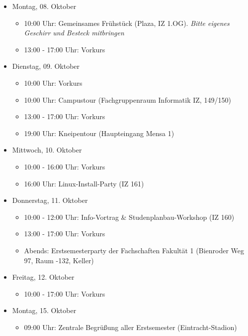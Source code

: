 \begin{itemize}
    \item Montag, 08. Oktober
        \begin{itemize}
            \item 10:00 Uhr: Gemeinsames Frühstück (Plaza, IZ 1.OG). \emph{Bitte eigenes Geschirr und Besteck mitbringen}
            \item 13:00 - 17:00 Uhr: Vorkurs
        \end{itemize}
    \item Dienstag, 09. Oktober
        \begin{itemize}
            \item 10:00 Uhr: Vorkurs
            \item 10:00 Uhr: Campustour (Fachgruppenraum Informatik IZ, 149/150)
            \item 13:00 - 17:00 Uhr: Vorkurs
            \item 19:00 Uhr: Kneipentour (Haupteingang Mensa 1)
        \end{itemize}
    \item Mittwoch, 10. Oktober
        \begin{itemize}
            \item 10:00 - 16:00 Uhr: Vorkurs
            \item 16:00 Uhr: Linux-Install-Party (IZ 161)
        \end{itemize}
    \pagebreak
    \item Donnerstag, 11. Oktober
        \begin{itemize}
            \item 10:00 - 12:00 Uhr: Info-Vortrag \& Studenplanbau-Workshop (IZ 160)
            \item 13:00 - 17:00 Uhr: Vorkurs
            \item Abends: Erstsemesterparty der Fachschaften Fakultät 1 (Bienroder Weg 97, Raum -132, Keller)
        \end{itemize}
    \item Freitag, 12. Oktober
        \begin{itemize}
            \item 10:00 - 17:00 Uhr: Vorkurs
        \end{itemize}
    \item Montag, 15. Oktober
        \begin{itemize}
            \item 09:00 Uhr: Zentrale Begrüßung aller Erstsemester (Eintracht-Stadion)

\end{itemize}
\end{itemize}
